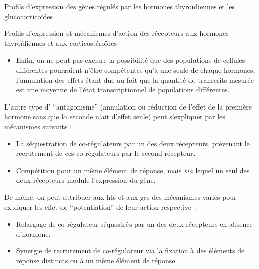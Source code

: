 \documentclass[../main.tex]{subfiles}
\begin{document}
\begin{chapter}{Profils d'expression des gènes régulés par les hormones thyroïdiennes et les glucocorticoïdes}
\begin{section}{Profils d'expression et mécanismes d'action des récepteurs aux hormones thyroïdiennes et aux corticostéroïdes}
\begin{itemize}
\item Enfin, on ne peut pas exclure la possibilité que des populations de cellules différentes pourraient n'être compétentes qu'à une seule de chaque hormones, l'annulation des effets étant due au fait que la quantité de transcrits mesurée est une moyenne de l'état transcriptionnel de populations différentes.
\end{itemize}
L'autre type d' ``antagonisme'' (annulation ou réduction de l'effet de la première hormone sans que la seconde n'ait d'effet seule) peut s'expliquer par les mécanismes suivants :
\begin{itemize}
\item La séquestration de co-régulateurs par un des deux récepteurs, prévenant le recrutement de ces co-régulateurs par le second récepteur.
\item Compétition pour un même élément de réponse, mais \textit{via} lequel un seul des deux récepteurs module l'expression du gène.
\end{itemize}
\par
De même, on peut attribuer aux \glspl{ht} et aux \glspl{gc} des mécanismes variés pour expliquer les effet de ``potentiation'' de leur action respective :
\begin{itemize}
\item Relargage de co-régulateur séquestrés par un des deux récepteurs en absence d'hormone.
\item Synergie de recrutement de co-régulateur via la fixation à des éléments de réponse distincts ou à un même élément de réponse.
\end{itemize}

\end{section}

\end{chapter}
\end{document}
